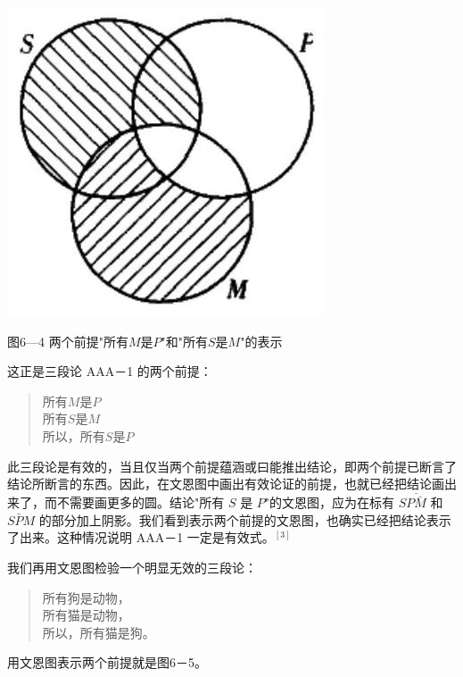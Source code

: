 \begin{center}
\includegraphics[width=\textwidth]{images/2025_05_15_6a28331d5e7c993ad07ag-275.jpg}

图6—4 两个前提"所有$M$是$P$"和"所有$S$是$M$"的表示
\end{center}

这正是三段论 AAA－1 的两个前提：
\begin{quote}
所有$M$是$P$\\
所有$S$是$M$\\
所以，所有$S$是$P$
\end{quote}

此三段论是有效的，当且仅当两个前提蕴涵或曰能推出结论，即两个前提已断言了结论所断言的东西。因此，在文恩图中画出有效论证的前提，也就已经把结论画出来了，而不需要画更多的圆。结论"所有 $S$ 是 $P$"的文恩图，应为在标有 $S\overline{P\bar{M}}$ 和 $S\bar{P}M$ 的部分加上阴影。我们看到表示两个前提的文恩图，也确实已经把结论表示了出来。这种情况说明 AAA－1 一定是有效式。$^{[3]}$

我们再用文恩图检验一个明显无效的三段论：

\begin{quote}
所有狗是动物，\\
所有猫是动物，\\
所以，所有猫是狗。
\end{quote}

用文恩图表示两个前提就是图6－5。

